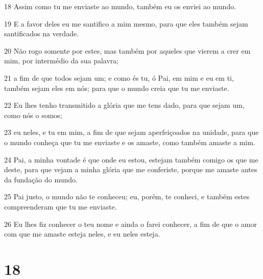 \par 18 Assim como tu me enviaste ao mundo, também eu os enviei ao mundo.
\par 19 E a favor deles eu me santifico a mim mesmo, para que eles também sejam santificados na verdade.
\par 20 Não rogo somente por estes, mas também por aqueles que vierem a crer em mim, por intermédio da sua palavra;
\par 21 a fim de que todos sejam um; e como és tu, ó Pai, em mim e eu em ti, também sejam eles em nós; para que o mundo creia que tu me enviaste.
\par 22 Eu lhes tenho transmitido a glória que me tens dado, para que sejam um, como nós o somos;
\par 23 eu neles, e tu em mim, a fim de que sejam aperfeiçoados na unidade, para que o mundo conheça que tu me enviaste e os amaste, como também amaste a mim.
\par 24 Pai, a minha vontade é que onde eu estou, estejam também comigo os que me deste, para que vejam a minha glória que me conferiste, porque me amaste antes da fundação do mundo.
\par 25 Pai justo, o mundo não te conheceu; eu, porém, te conheci, e também estes compreenderam que tu me enviaste.
\par 26 Eu lhes fiz conhecer o teu nome e ainda o farei conhecer, a fim de que o amor com que me amaste esteja neles, e eu neles esteja.

\chapter{18}


